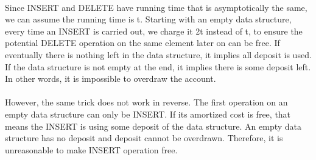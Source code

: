 \begin{problem}{4} ~\\
Since INSERT and DELETE have running time that is asymptotically the same, we can assume the running time is t. Starting with an empty data structure, every time an INSERT is carried out, we charge it 2t instead of t, to ensure the potential DELETE operation on the same element later on can be free. If eventually there is nothing left in the data structure, it implies all deposit is used. If the data structure is not empty at the end, it implies there is some deposit left. In other words, it is impossible to overdraw the account.\\
\\
However, the same trick does not work in reverse. The first operation on an empty data structure can only be INSERT. If its amortized cost is free, that means the INSERT is using some deposit of the data structure. An empty data structure has no deposit and deposit cannot be overdrawn. Therefore, it is unreasonable to make INSERT operation free.
\end{problem}